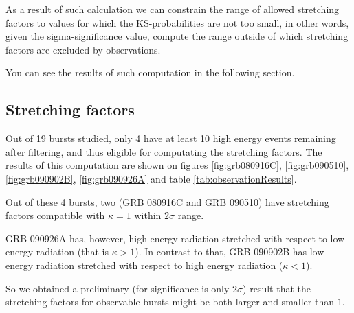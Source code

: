 \documentclass{article}
\begin{document}
As a result of such calculation we can constrain the range of allowed stretching factors to values for which the KS-probabilities are not too small, in other words, given the sigma-significance value, compute the range outside of which stretching factors are excluded by observations.

You can see the results of such computation in the following section.

\subsection{Stretching factors}

Out of 19 bursts studied, only 4 have at least 10 high energy events remaining after filtering, and thus eligible for computating the stretching factors. The results of this computation are shown on figures \ref{fig:grb080916C}, \ref{fig:grb090510}, \ref{fig:grb090902B}, \ref{fig:grb090926A} and table \ref{tab:observationResults}.

Out of these 4 bursts, two (GRB 080916C and GRB 090510) have stretching factors compatible with $\kappa = 1$ within $2\sigma$ range.

GRB 090926A has, however, high energy radiation stretched with respect to low energy radiation (that is $\kappa > 1$). In contrast to that, GRB 090902B has low energy radiation stretched with respect to high energy radiation ($\kappa < 1$).

So we obtained a preliminary (for significance is only $2\sigma$) result that the stretching factors for observable bursts might be both larger and smaller than $1$.
\end{document}
